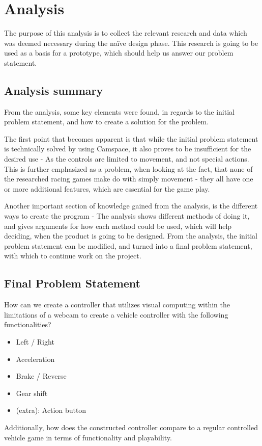 \section{Analysis} \label{sec:analysis}
The purpose of this analysis is to collect the relevant research and data which was deemed necessary during the naïve design phase. This research is going to be used as a basis for a prototype, which should help us answer our problem statement. 










\subsection{Analysis summary}
From the analysis, some key elements were found, in regards to the initial problem statement, and how to create a solution for the problem.

The first point that becomes apparent is that while the initial problem statement is technically solved by using Camspace, it also proves to be insufficient for the desired use - As the controls are limited to movement, and not special actions. This is further emphasized as a problem, when looking at the fact, that none of the researched racing games make do with simply movement - they all have one or more additional features, which are essential for the game play.

Another important section of knowledge gained from the analysis, is the different ways to create the program - The analysis shows different methods of doing it, and gives arguments for how each method could be used, which will help deciding, when the product is going to be designed.
From the analysis, the initial problem statement can be modified, and turned into a final problem statement, with which to continue work on the project.

\subsection{Final Problem Statement}
How can we create a controller that utilizes visual computing within the limitations of a webcam to create a vehicle controller with the following functionalities?
\begin{itemize}
\item Left / Right
\item Acceleration
\item Brake / Reverse
\item Gear shift
\item (extra): Action button
\end{itemize}
Additionally, how does the constructed controller compare to a regular controlled vehicle game in terms of functionality and playability.